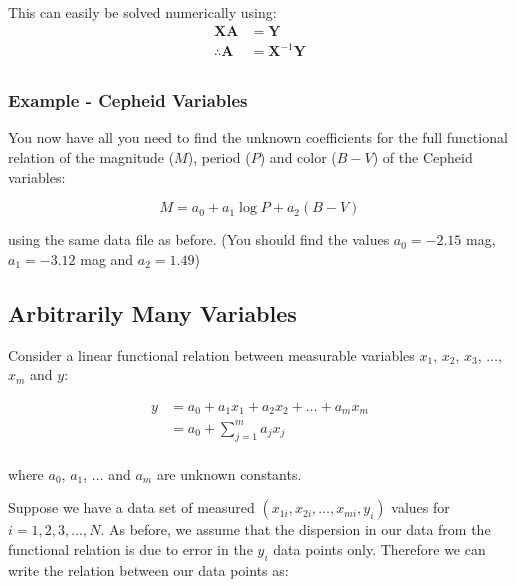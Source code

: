\documentclass[11pt]{article}
\begin{document}
This can easily be solved numerically using: \[
\begin{align*}
\boldsymbol{X}\boldsymbol{A} &= \boldsymbol{Y}\\ 
\therefore \boldsymbol{A} &= \boldsymbol{X}^{-1} \boldsymbol{Y}\\
\end{align*}
\]





    \hypertarget{example---cepheid-variables}{%
\subsubsection*{Example - Cepheid
Variables}\label{example---cepheid-variables}}





    You now have all you need to find the unknown coefficients for the full
functional relation of the magnitude (\(M\)), period (\(P\)) and color
(\(B-V\)) of the Cepheid variables:

\[
M = a_0 + a_1 \log P + a_2 (B - V)
\]

using the same data file as before. (You should find the values
\(a_0 = -2.15\) mag, \(a_1 = -3.12\) mag and \(a_2 = 1.49\))





    \hypertarget{arbitrarily-many-variables}{%
\subsection*{Arbitrarily Many
Variables}\label{arbitrarily-many-variables}}





    Consider a linear functional relation between measurable variables
\(x_1\), \(x_2\), \(x_3\), \(\dots\), \(x_m\) and \(y\):

\[
\begin{align*}
y   &= a_0 + a_1 x_1 + a_2 x_2 + \dots + a_m x_m\\
    &= a_0 + \sum_{j = 1}^m a_j x_j\\
\end{align*}
\]

where \(a_0\), \(a_1\), \(\dots\) and \(a_m\) are unknown constants.

Suppose we have a data set of measured
\((x_{1i}, x_{2i}, \dots, x_{mi}, y_i)\) values for
\(i = 1, 2, 3, \dots, N\). As before, we assume that the dispersion in
our data from the functional relation is due to error in the \(y_i\)
data points only. Therefore we can write the relation between our data
points as:
\end{document}
